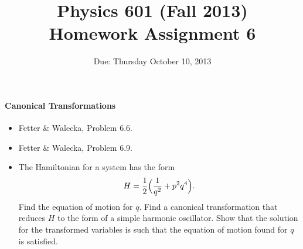 \documentclass[letterpaper,11pt]{article}
\title{Physics 601 (Fall 2013) \\ Homework Assignment 6}
\date{Due: Thursday October 10, 2013}
\begin{document}
\maketitle

\paragraph*{Canonical Transformations}
\begin{itemize}
 \item Fetter \& Walecka, Problem 6.6.
 \item Fetter \& Walecka, Problem 6.9.
 \item The Hamiltonian for a system has the form
 \begin{equation*}
  H = \frac{1}{2} \Bigl( \frac{1}{q^2} + p^2 q^4 \Bigr).
 \end{equation*}
 Find the equation of motion for $q$.  Find a canonical transformation that reduces $H$ to the form of a simple harmonic oscillator.  Show that the solution for the transformed variables is such that the equation of motion found for $q$ is satisfied.
\end{itemize}
\end{document}

